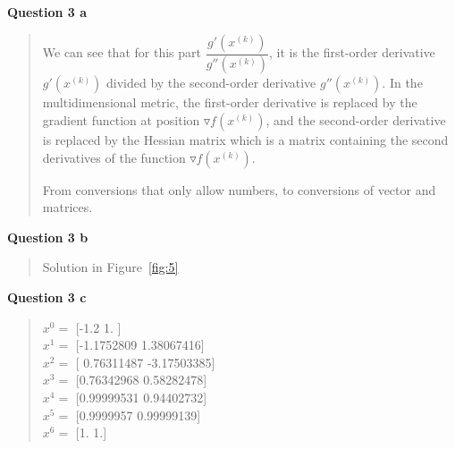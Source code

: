\documentclass[12pt,a4paper]{article}
\begin{document}
    \newpage
    \textbf{Question 3 a}
    \vspace{2mm}
    \begin{quote}
        We can see that for this part $\dfrac{g'(x^{(k)})}{g''(x^{(k)})}$,
        it is the first-order derivative $g'(x^{(k)})$ divided by the second-order derivative $g''(x^{(k)})$.
        In the multidimensional metric, the first-order derivative is replaced by the gradient function at position $\triangledown f(x^{(k)})$,
        and the second-order derivative is replaced by the Hessian matrix which is a matrix containing the second derivatives of the function $\triangledown f(x^{(k)})$.

        From conversions that only allow numbers, to conversions of vector and matrices.
    \end{quote}

    \vspace{12mm}
    \textbf{Question 3 b}
    \vspace{2mm}
    \begin{quote}
        Solution in Figure~\ref{fig:5}
    \end{quote}

    \vspace{12mm}
    \textbf{Question 3 c}
    \vspace{2mm}
    \begin{quote}
        $x^0 = $ [-1.2  1. ]\\
        $x^1 = $ [-1.1752809   1.38067416]\\
        $x^2 = $ [ 0.76311487 -3.17503385]\\
        $x^3 = $ [0.76342968 0.58282478]\\
        $x^4 = $ [0.99999531 0.94402732]\\
        $x^5 = $ [0.9999957  0.99999139]\\
        $x^6 = $ [1. 1.]
    \end{quote}
\end{document}
